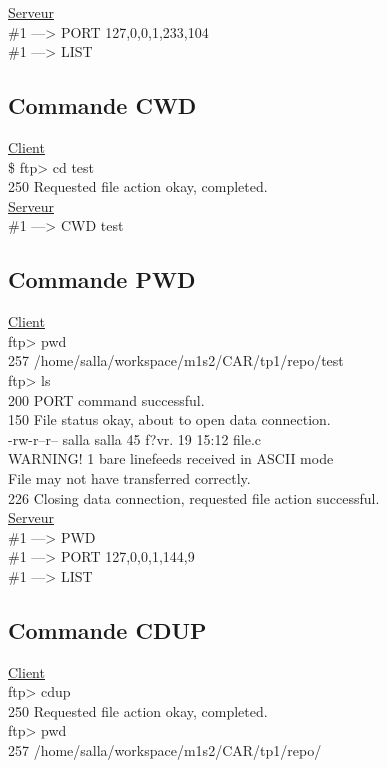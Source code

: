 \underline{Serveur}\\
\#1 ---> PORT 127,0,0,1,233,104\\
\#1 ---> LIST

\subsection*{Commande CWD}

\underline{Client}\\
\$ ftp> cd test\\
250 Requested file action okay, completed.\\

\underline{Serveur}\\
\#1 ---> CWD test

\subsection*{Commande PWD}

\underline{Client}\\
ftp> pwd\\
257 /home/salla/workspace/m1s2/CAR/tp1/repo/test\\
ftp> ls\\
200 PORT command successful.\\
150 File status okay, about to open data connection.\\
-rw-r--r-- salla salla     45 f?vr. 19 15:12 file.c\\
WARNING! 1 bare linefeeds received in ASCII mode\\
File may not have transferred correctly.\\
226 Closing data connection, requested file action successful.\\

\underline{Serveur}\\
\#1 ---> PWD\\
\#1 ---> PORT 127,0,0,1,144,9\\
\#1 ---> LIST

\subsection*{Commande CDUP}

\underline{Client}\\
ftp> cdup\\
250 Requested file action okay, completed.\\
ftp> pwd\\
257 /home/salla/workspace/m1s2/CAR/tp1/repo/\\

